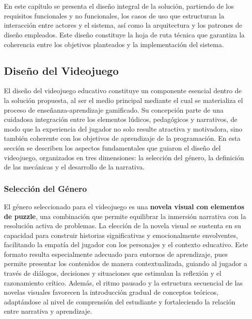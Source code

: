 \chapter{\chapterSecond}
En este capítulo se presenta el diseño integral de la solución, partiendo de los requisitos funcionales y no funcionales, los casos de uso que estructuran la interacción entre actores y el sistema, así como la arquitectura y los patrones de diseño empleados. Este diseño constituye la hoja de ruta técnica que garantiza la coherencia entre los objetivos planteados y la implementación del sistema.

\section{Diseño del Videojuego}

El diseño del videojuego educativo constituye un componente esencial dentro de la solución propuesta, al ser el medio principal mediante el cual se materializa el proceso de enseñanza-aprendizaje gamificado. Su concepción parte de una cuidadosa integración entre los elementos lúdicos, pedagógicos y narrativos, de modo que la experiencia del jugador no solo resulte atractiva y motivadora, sino también coherente con los objetivos de aprendizaje de la programación. En esta sección se describen los aspectos fundamentales que guiaron el diseño del videojuego, organizados en tres dimensiones: la selección del género, la definición de las mecánicas y el desarrollo de la narrativa.

\subsection{Selección del Género}

El género seleccionado para el videojuego es una \textbf{novela visual con elementos de puzzle}, una combinación que permite equilibrar la inmersión narrativa con la resolución activa de problemas. La elección de la novela visual se sustenta en su capacidad para construir historias significativas y emocionalmente envolventes, facilitando la empatía del jugador con los personajes y el contexto educativo. Este formato resulta especialmente adecuado para entornos de aprendizaje, pues permite presentar los contenidos de manera contextualizada, guiando al jugador a través de diálogos, decisiones y situaciones que estimulan la reflexión y el razonamiento crítico. Además, el ritmo pausado y la estructura secuencial de las novelas visuales favorecen la introducción gradual de conceptos teóricos, adaptándose al nivel de comprensión del estudiante y fortaleciendo la relación entre narrativa y aprendizaje.

